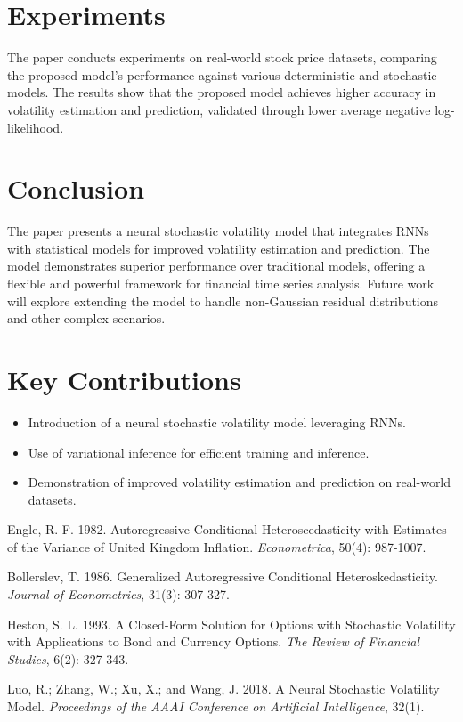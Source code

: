 \documentclass[letterpaper, 11pt]{article}
\begin{document}
\section{Experiments}
The paper conducts experiments on real-world stock price datasets, comparing the proposed model's performance against various deterministic and stochastic models. The results show that the proposed model achieves higher accuracy in volatility estimation and prediction, validated through lower average negative log-likelihood.

\section{Conclusion}
The paper presents a neural stochastic volatility model that integrates RNNs with statistical models for improved volatility estimation and prediction. The model demonstrates superior performance over traditional models, offering a flexible and powerful framework for financial time series analysis. Future work will explore extending the model to handle non-Gaussian residual distributions and other complex scenarios.

\section{Key Contributions}
\begin{itemize}
    \item Introduction of a neural stochastic volatility model leveraging RNNs.
    \item Use of variational inference for efficient training and inference.
    \item Demonstration of improved volatility estimation and prediction on real-world datasets.
\end{itemize}

\begin{thebibliography}{}
Engle, R. F. 1982. Autoregressive Conditional Heteroscedasticity with Estimates of the Variance of United Kingdom Inflation. \emph{Econometrica}, 50(4): 987-1007.

Bollerslev, T. 1986. Generalized Autoregressive Conditional Heteroskedasticity. \emph{Journal of Econometrics}, 31(3): 307-327.

Heston, S. L. 1993. A Closed-Form Solution for Options with Stochastic Volatility with Applications to Bond and Currency Options. \emph{The Review of Financial Studies}, 6(2): 327-343.

Luo, R.; Zhang, W.; Xu, X.; and Wang, J. 2018. A Neural Stochastic Volatility Model. \emph{Proceedings of the AAAI Conference on Artificial Intelligence}, 32(1).
\end{thebibliography}
\end{document}
